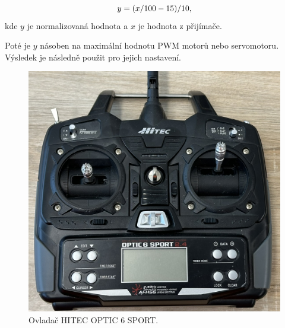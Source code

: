 \begin{equation}
	\centering
	y = (x / 100 - 15) / 10,
\end{equation}
kde $y$ je normalizovaná hodnota a $x$ je hodnota z přijímače. 

Poté je $y$ násoben na maximální hodnotu PWM motorů nebo servomotoru. Výsledek je 
následně použit pro jejich nastavení.

\begin{figure}[!h]
    \centering
    \includegraphics[width = .5\linewidth]{Figures/Joystick.png}
    \caption{Ovladač HITEC OPTIC 6 SPORT.}
    \label{fig:Joystick}
    \vspace{-10pt}
\end{figure}

\endinput